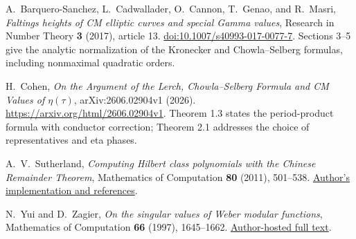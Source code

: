 A.~Barquero-Sanchez, L.~Cadwallader, O.~Cannon, T.~Genao, and R.~Masri,
\emph{Faltings heights of CM elliptic curves and special Gamma values},
Research in Number Theory \textbf{3} (2017), article 13.
\href{https://doi.org/10.1007/s40993-017-0077-7}{doi:10.1007/s40993-017-0077-7}.
Sections 3--5 give the analytic normalization of the Kronecker and
Chowla--Selberg formulas, including nonmaximal quadratic orders.

H.~Cohen, \emph{On the Argument of the Lerch, Chowla--Selberg Formula
and CM Values of $\eta(\tau)$}, arXiv:2606.02904v1 (2026).
\url{https://arxiv.org/html/2606.02904v1}.
Theorem 1.3 states the period-product formula with conductor correction;
Theorem 2.1 addresses the choice of representatives and eta phases.

A.~V.~Sutherland, \emph{Computing Hilbert class polynomials with the
Chinese Remainder Theorem}, Mathematics of Computation \textbf{80}
(2011), 501--538.
\href{https://math.mit.edu/~drew/classpoly.html}{Author's implementation and references}.

N.~Yui and D.~Zagier, \emph{On the singular values of Weber modular
functions}, Mathematics of Computation \textbf{66} (1997), 1645--1662.
\href{https://people.mpim-bonn.mpg.de/zagier/files/doi/10.1090/S0025-5718-97-00854-5/fulltext.pdf}{Author-hosted full text}.
